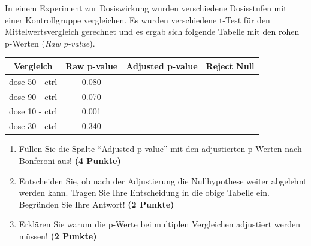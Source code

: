 \documentclass[a4paper, 9pt]{scrartcl}\usepackage[]{graphicx}\usepackage[]{xcolor}
\newenvironment{knitrout}{}{} %
\begin{document}
In einem Experiment zur Dosiswirkung wurden verschiedene Dosisstufen mit
einer Kontrollgruppe vergleichen. Es wurden verschiedene t-Test f{\"u}r den
Mittelwertsvergleich gerechnet und es ergab sich folgende Tabelle mit den
rohen p-Werten (\textit{Raw p-value}).


\begin{knitrout}
\color{fgcolor}\begin{table}[!h]
\centering\begingroup\fontsize{12}{14}\selectfont

\begin{tabular}{cccc}
\toprule
Vergleich & Raw p-value & Adjusted p-value & Reject Null\\
\midrule
dose 50 - ctrl & 0.080 &  & \\
dose 90 - ctrl & 0.070 &  & \\
dose 10 - ctrl & 0.001 &  & \\
dose 30 - ctrl & 0.340 &  & \\
\bottomrule
\end{tabular}
\endgroup{}
\end{table}

\end{knitrout}



\begin{enumerate}
\item F{\"u}llen Sie die Spalte "`Adjusted p-value"' mit den adjustierten
  p-Werten nach Bonferoni aus! \textbf{(4 Punkte)}
\item Entscheiden Sie, ob nach der Adjustierung die Nullhypothese weiter
  abgelehnt werden kann. Tragen Sie Ihre Entscheidung in die obige Tabelle
  ein. Begr{\"u}nden Sie Ihre Antwort! \textbf{(2 Punkte)}
\item Erkl{\"a}ren Sie warum die p-Werte bei multiplen Vergleichen
  adjustiert werden m{\"u}ssen! \textbf{(2 Punkte)}
\end{enumerate}
\end{document}
